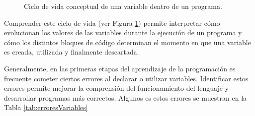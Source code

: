 \documentclass[12pt,twoside]{book}
\begin{document}
					\begin{figure}[H]
						\centering
						
						\caption[Ciclo de vida de una variable]{Ciclo de vida conceptual de una variable dentro de un programa.}
						\label{fig:cicloVidaVariable}
					\end{figure}
					
					\noindent
					Comprender este ciclo de vida (ver Figura \ref{fig:cicloVidaVariable}) permite interpretar cómo evolucionan los valores de las variables durante la ejecución de un programa y cómo los distintos bloques de código determinan el momento en que una variable es creada, utilizada y finalmente descartada.
					
					Generalmente, en las primeras etapas del aprendizaje de la programación es frecuente cometer ciertos errores al declarar o utilizar variables. Identificar estos errores permite mejorar la comprensión del funcionamiento del lenguaje y desarrollar programas más correctos. Algunos es estos errores se muestran en la Tabla \ref{tab:erroresVariables}
					
\end{document}
